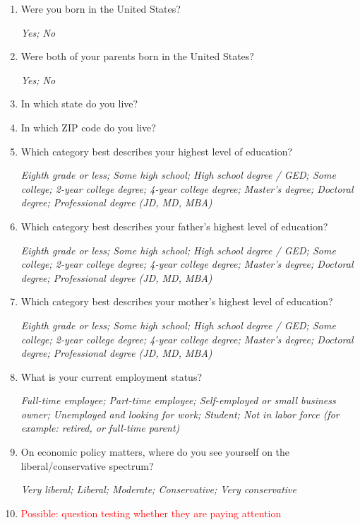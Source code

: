 \documentclass[11pt, headsepline]{article}
\newcommand{\red}[1]{\textcolor{red}{#1}}
\begin{document}
\begin{enumerate}[resume]
    \textit{European American/White; African American/Black; Hispanic/Latino; Asian/Asian American; Other}

    \item Were you born in the United States?

    \textit{Yes; No}

    \item Were both of your parents born in the United States?

    \textit{Yes; No}

    \item In which state do you live?

    \item In which ZIP code do you live?

    \item Which category best describes your highest level of education?

    \textit{Eighth grade or less; Some high school; High school degree / GED; Some college; 2-year college degree; 4-year college degree; Master’s degree; Doctoral degree; Professional degree (JD, MD, MBA)}

    \item Which category best describes your father's highest level of education?

    \textit{Eighth grade or less; Some high school; High school degree / GED; Some college; 2-year college degree; 4-year college degree; Master’s degree; Doctoral degree; Professional degree (JD, MD, MBA)}

    \item Which category best describes your mother's highest level of education?

    \textit{Eighth grade or less; Some high school; High school degree / GED; Some college; 2-year college degree; 4-year college degree; Master’s degree; Doctoral degree; Professional degree (JD, MD, MBA)}

    \item What is your current employment status?

    \textit{Full-time employee; Part-time employee; Self-employed or small business owner; Unemployed and looking for work; Student; Not in labor force (for example: retired, or full-time parent)}

    \item On economic policy matters, where do you see yourself on the liberal/conservative spectrum?

    \textit{Very liberal; Liberal; Moderate; Conservative; Very conservative}

    \item \red{Possible: question testing whether they are paying attention}

    \textit{}
\end{enumerate}
\end{document}
